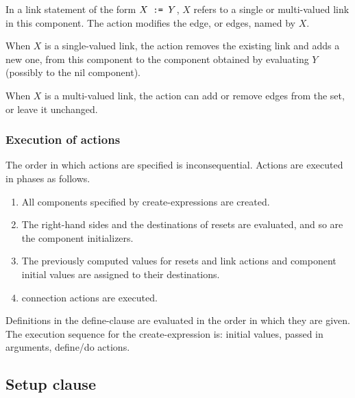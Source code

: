 In a link statement of the form $X \hbox{\tt\ := } Y$, $X$ refers to a
single or multi-valued link in this component.  The action modifies
the edge, or edges, named by $X$.

When $X$ is a single-valued link, the action removes the
existing link and adds a new one, from this component to the
component obtained by evaluating $Y$ (possibly to the {\tok nil}
component).

When $X$ is a multi-valued link, the action can add or remove
edges from the set, or leave it unchanged.


\subsubsection{Execution of actions}

The order in which actions are specified is inconsequential.  Actions
are executed in phases as follows.

\begin{enumerate}

\item All components specified by {\nont create-expression}s are
created.

\item The right-hand sides and the destinations of resets are
evaluated, and so are the component initializers.

\item The previously computed values for resets and link actions
and component initial values are assigned to their destinations.

\item connection actions are executed.

\end{enumerate}
%
Definitions in the {\nont define-clause} are evaluated in
the order in which they are given.
The execution sequence for the {\nont create-expression} is:
initial values, passed in arguments, define/do actions.

\subsection{Setup clause\label{setup-semantics}}

